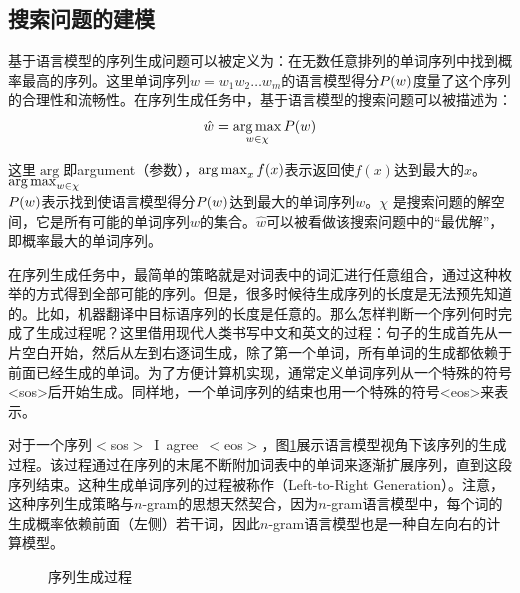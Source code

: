 
\subsection{搜索问题的建模}

\parinterval 基于语言模型的序列生成问题可以被定义为：在无数任意排列的单词序列中找到概率最高的序列。这里单词序列$w = w_1 w_2 \ldots w_m$的语言模型得分${P}(w)$度量了这个序列的合理性和流畅性。在序列生成任务中，基于语言模型的搜索问题可以被描述为：
\begin{eqnarray}
\hat{w} = \operatorname*{arg\,max}_{w \in \chi}{P}(w)
\label{eq:2-42}
\end{eqnarray}

\noindent 这里$\arg$即argument（参数），$\operatorname*{arg\,max}_x f(x)$表示返回使$f(x)$达到最大的$x$。$\operatorname*{arg\,max}_{w \in \chi}$\\${P}(w)$表示找到使语言模型得分${P}(w)$达到最大的单词序列$w$。$\chi$ 是搜索问题的解空间，它是所有可能的单词序列$w$的集合。$\hat{w}$可以被看做该搜索问题中的“最优解”，即概率最大的单词序列。

\parinterval 在序列生成任务中，最简单的策略就是对词表中的词汇进行任意组合，通过这种枚举的方式得到全部可能的序列。但是，很多时候待生成序列的长度是无法预先知道的。比如，机器翻译中目标语序列的长度是任意的。那么怎样判断一个序列何时完成了生成过程呢？这里借用现代人类书写中文和英文的过程：句子的生成首先从一片空白开始，然后从左到右逐词生成，除了第一个单词，所有单词的生成都依赖于前面已经生成的单词。为了方便计算机实现，通常定义单词序列从一个特殊的符号<sos>后开始生成。同样地，一个单词序列的结束也用一个特殊的符号<eos>来表示。

\parinterval 对于一个序列$<$sos$>$\ I\ agree\ $<$eos$>$，图\ref{fig:2-12}展示语言模型视角下该序列的生成过程。该过程通过在序列的末尾不断附加词表中的单词来逐渐扩展序列，直到这段序列结束。这种生成单词序列的过程被称作{\small{}}（Left-to-Right Generation）。注意，这种序列生成策略与$n$-gram的思想天然契合，因为$n$-gram语言模型中，每个词的生成概率依赖前面（左侧）若干词，因此$n$-gram语言模型也是一种自左向右的计算模型。

\begin{figure}[htp]
    \centering
 	
	\caption{序列生成过程}
    \label{fig:2-12}
\end{figure}

